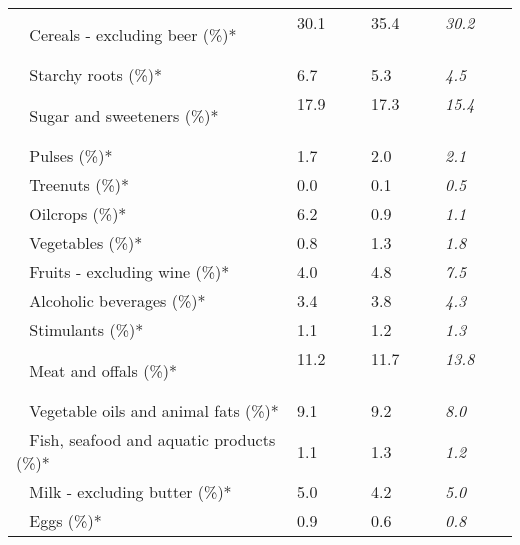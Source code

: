 \begin{tabular}{L{3.9cm} R{1cm} R{1cm} R{1cm}}
	 ~ Cereals - excluding beer (\%)* & 30.1 ~ \ \ & 35.4 ~ \ \ & \textit{30.2} ~ \ \ \\ 
	 ~ Starchy roots (\%)* & 6.7 ~ \ \ & 5.3 ~ \ \ & \textit{4.5} ~ \ \ \\ 
	 ~ Sugar and sweeteners (\%)* & 17.9 ~ \ \ & 17.3 ~ \ \ & \textit{15.4} ~ \ \ \\ 
	 ~ Pulses (\%)* & 1.7 ~ \ \ & 2.0 ~ \ \ & \textit{2.1} ~ \ \ \\ 
	 ~ Treenuts (\%)* & 0.0 ~ \ \ & 0.1 ~ \ \ & \textit{0.5} ~ \ \ \\ 
	 ~ Oilcrops (\%)* & 6.2 ~ \ \ & 0.9 ~ \ \ & \textit{1.1} ~ \ \ \\ 
	 ~ Vegetables (\%)* & 0.8 ~ \ \ & 1.3 ~ \ \ & \textit{1.8} ~ \ \ \\ 
	 ~ Fruits - excluding wine (\%)* & 4.0 ~ \ \ & 4.8 ~ \ \ & \textit{7.5} ~ \ \ \\ 
	 ~ Alcoholic beverages (\%)* & 3.4 ~ \ \ & 3.8 ~ \ \ & \textit{4.3} ~ \ \ \\ 
	 ~ Stimulants (\%)* & 1.1 ~ \ \ & 1.2 ~ \ \ & \textit{1.3} ~ \ \ \\ 
	 ~ Meat and offals (\%)* & 11.2 ~ \ \ & 11.7 ~ \ \ & \textit{13.8} ~ \ \ \\ 
	 ~ Vegetable oils and animal fats (\%)* & 9.1 ~ \ \ & 9.2 ~ \ \ & \textit{8.0} ~ \ \ \\ 
	 ~ Fish, seafood and aquatic products (\%)* & 1.1 ~ \ \ & 1.3 ~ \ \ & \textit{1.2} ~ \ \ \\ 
	 ~ Milk - excluding butter (\%)* & 5.0 ~ \ \ & 4.2 ~ \ \ & \textit{5.0} ~ \ \ \\ 
	 ~ Eggs (\%)* & 0.9 ~ \ \ & 0.6 ~ \ \ & \textit{0.8} ~ \ \ \\ 
       \toprule
      \end{tabular}
      \clearpage
{}
